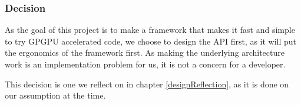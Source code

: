 %
%

\subsubsection{Decision}
As the goal of this project is to make a framework that makes it fast and simple to try GPGPU accelerated code, we choose to design the API first, as it will put the ergonomics of the framework first. As making the underlying architecture work is an implementation problem for us, it is not a concern for a developer.

This decision is one we reflect on in chapter \ref{designReflection}, as it is done on our assumption at the time.
